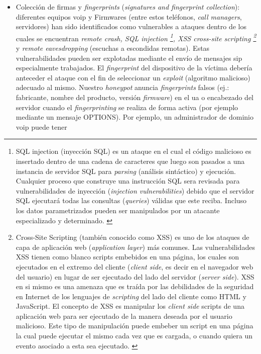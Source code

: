 \documentclass[a4paper,12pt]{report}
\begin{document}
\begin{itemize}
\item Colección de firmas y \emph{fingerprints} (\emph{signatures and
fingerprint collection}):
   diferentes equipos \ac{voip} y Firmwares (entre estos teléfonos, \emph{call
managers}, servidores) han sido identificados como vulnerables a ataques dentro de los cuales
se encuentran
\emph{remote crash, SQL injection \footnote{SQL injection (inyección SQL) es un ataque en el cual
el código malicioso es insertado dentro de una cadena de caracteres que luego son pasados a una
instancia de servidor SQL para \emph{parsing} (análisis sintáctico) y ejecución. Cualquier proceso que
construye una instrucción SQL sera revisada para vulnerabilidades de inyección (\emph{injection
vulnerabilities}) debido que el servidor SQL ejecutará todas las consultas (\emph{queries}) válidas
que este reciba. Incluso los datos parametrizados pueden ser manipulados por un
atacante especializado y determinado. \cite{microsoftsql}}, XSS cross-site \emph{scripting}
\footnote{Cross-Site Scripting
(también conocido como XSS) es uno de los ataques de capa de aplicación web
(\emph{\mbox{application} \mbox{layer}}) más comunes. Las vulnerabilidades XSS tienen como blanco
scripts embebidos en una página, los cuales son ejecutados en el extremo del
cliente (\emph{client side}, es decir en el navegador web del usuario) en lugar de ser
ejecutado del lado del servidor (\emph{server side}). XSS en si mismo es una amenaza
que es traída por las debilidades de la seguridad en Internet de los lenguajes
de \emph{scripting} del lado del cliente como HTML y JavaScript. El concepto de
XSS es manipular los \emph{client side} scripts de una aplicación web para ser
ejecutado de la manera deseada por el usuario malicioso. Este tipo  de
manipulación puede embeber un script en una página la cual puede ejecutar el
mismo cada vez que es cargada, o cuando quiera un evento asociado a esta sea
ejecutado. \cite{acunetix}}} y \emph{remote eavesdropping}
(escuchas a escondidas remotas). Estas vulnerabilidades pueden ser explotadas
mediante el envío de mensajes \ac{sip} especialmente trabajados. El \emph{fingerprint} del
dispositivo de la víctima debería anteceder el ataque con el fin de seleccionar
un \emph{exploit} (algoritmo malicioso) adecuado al mismo. Nuestro \emph{honeypot}
anuncia \emph{fingerprints} falsos (ej.: fabricante, nombre del producto, versión
\emph{firmware}) en el \ac{ua} o encabezado del servidor
cuando el \emph{fingerprinting} se realiza de forma activa (por ejemplo mediante un
mensaje OPTIONS). Por ejemplo, un administrador de dominio \ac{voip} puede tener

\end{itemize}
\end{document}
